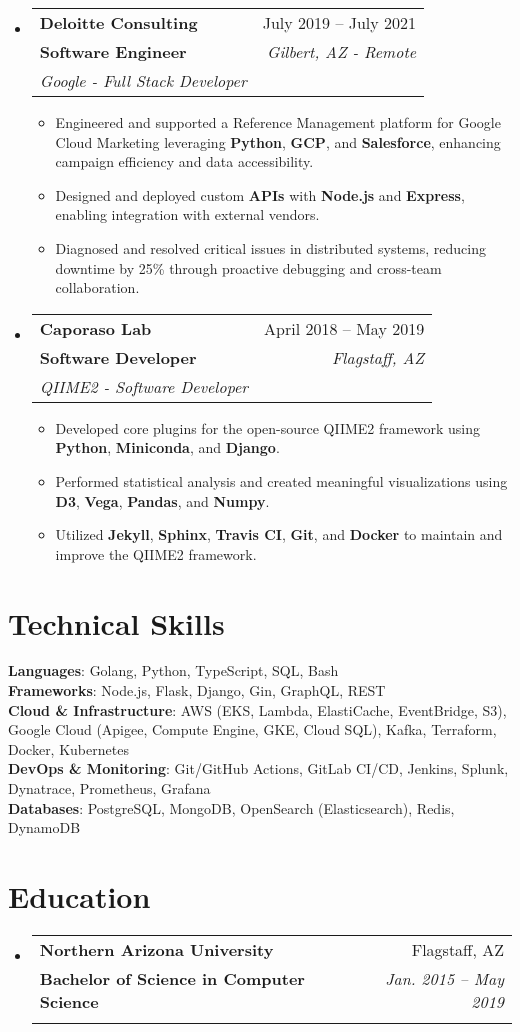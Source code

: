 \documentclass[letterpaper,11pt]{article}
\makeatletter
\newcommand{\resumeItem}[1]{
  \item\small{
    {#1 \vspace{-2pt}}
  }
}
\newcommand{\resumeSubheading}[5]{
  \vspace{-2pt}\item
    \begin{tabular*}{0.97\textwidth}[t]{l@{\extracolsep{\fill}}r}
      \textbf{#1} & #2 \\
      \textbf{\small#3} & \textit{\small #4} \\
      \textit{\small#5} \\
    \end{tabular*}\vspace{-7pt}
}
\newcommand{\resumeSubHeadingListStart}{\begin{itemize}[leftmargin=0.15in, label={}]}
\newcommand{\resumeSubHeadingListEnd}{\end{itemize}}
\newcommand{\resumeItemListStart}{\begin{itemize}}
\newcommand{\resumeItemListEnd}{\end{itemize}\vspace{-5pt}}
\makeatother
\begin{document}
\resumeSubHeadingListStart
\resumeSubheading
{Deloitte Consulting}{July 2019 -- July 2021}
{Software Engineer}{Gilbert, AZ - Remote}
{Google - Full Stack Developer}
\resumeItemListStart
\resumeItem{Engineered and supported a Reference Management platform for Google Cloud Marketing leveraging \textbf{Python}, \textbf{GCP}, and \textbf{Salesforce}, enhancing campaign efficiency and data accessibility.}
\resumeItem{Designed and deployed custom \textbf{APIs} with \textbf{Node.js} and \textbf{Express}, enabling integration with external vendors.}
\resumeItem{Diagnosed and resolved critical issues in distributed systems, reducing downtime by 25\% through proactive debugging and cross-team collaboration.}
\resumeItemListEnd
\resumeSubHeadingListEnd



\resumeSubHeadingListStart
\resumeSubheading
{Caporaso Lab}{April 2018 -- May 2019}
{Software Developer}{Flagstaff, AZ}
{QIIME2 - Software Developer}
\resumeItemListStart
\resumeItem{Developed core plugins for the open-source QIIME2 framework using \textbf{Python}, \textbf{Miniconda}, and \textbf{Django}.}
\resumeItem{Performed statistical analysis and created meaningful visualizations using \textbf{D3}, \textbf{Vega}, \textbf{Pandas}, and \textbf{Numpy}.}
\resumeItem{Utilized \textbf{Jekyll}, \textbf{Sphinx}, \textbf{Travis CI}, \textbf{Git}, and \textbf{Docker} to maintain and improve the QIIME2 framework.}
\resumeItemListEnd
\resumeSubHeadingListEnd


\section{Technical Skills}
\begin{itemize}[leftmargin=0.15in, label={}]
 \small{\item{
       \textbf{Languages}{: Golang, Python, TypeScript, SQL, Bash} \\
       \textbf{Frameworks}{: Node.js, Flask, Django, Gin, GraphQL, REST} \\
       \textbf{Cloud \& Infrastructure}{: AWS (EKS, Lambda, ElastiCache, EventBridge, S3), Google Cloud (Apigee, Compute Engine, GKE, Cloud SQL), Kafka, Terraform, Docker, Kubernetes} \\
       \textbf{DevOps \& Monitoring}{: Git/GitHub Actions, GitLab CI/CD, Jenkins, Splunk, Dynatrace, Prometheus, Grafana} \\
       \textbf{Databases}{: PostgreSQL, MongoDB, OpenSearch (Elasticsearch), Redis, DynamoDB}
       }}
\end{itemize}

\section{Education}
\resumeSubHeadingListStart
\resumeSubheading
{Northern Arizona University}{Flagstaff, AZ}
{\normalfont Bachelor of Science in Computer Science}{Jan. 2015 -- May 2019}
{}
\resumeSubHeadingListEnd

\end{document}
